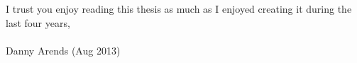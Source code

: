 \documentclass[11pt, twoside]{extbook}
\begin{document}
I trust you enjoy reading this thesis as much as I enjoyed creating it during the last four years,\\\\

Danny Arends (Aug 2013)
\newpage
\thispagestyle{empty}

















{\footnotesize

}
\end{document}
